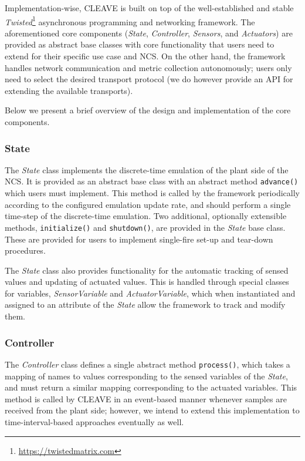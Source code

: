 Implementation-wise, \ac{CLEAVE} is built on top of the well-established and stable \emph{Twisted}\footnote{\url{https://twistedmatrix.com}} asynchronous programming and networking framework.
The aforementioned core components (\emph{State}, \emph{Controller}, \emph{Sensors}, and \emph{Actuators}) are provided as abstract base classes with core functionality that users need to extend for their specific use case and \ac{NCS}.
On the other hand, the framework handles network communication and metric collection autonomously; users only need to select the desired transport protocol (we do however provide an \ac{API} for extending the available transports).

Below we present a brief overview of the design and implementation of the core components.

\subsubsection{State}

The \emph{State} class implements the discrete-time emulation of the plant side of the \ac{NCS}.
It is provided as an abstract base class with an abstract method
\texttt{advance()} which users must implement.
This method is called by the framework periodically according to the configured emulation update rate, and should perform a single time-step of the discrete-time emulation.
Two additional, optionally extensible methods, \texttt{initialize()} and \texttt{shutdown()}, are provided in the \emph{State} base class.
These are provided for users to implement single-fire set-up and tear-down procedures.

The \emph{State} class also provides functionality for the automatic tracking of sensed values and updating of actuated values.
This is handled through special classes for variables, \emph{SensorVariable} and \emph{ActuatorVariable}, which when instantiated and assigned to an attribute of the \emph{State} allow the framework to track and modify them.

\subsubsection{Controller}

The \emph{Controller} class defines a single abstract method \texttt{process()}, which takes a mapping of names to values corresponding to the sensed variables of the \emph{State}, and must return a similar mapping corresponding to the actuated variables.
This method is called by \ac{CLEAVE} in an event-based manner whenever samples are received from the plant side; however, we intend to extend this implementation to time-interval-based approaches eventually as well.

